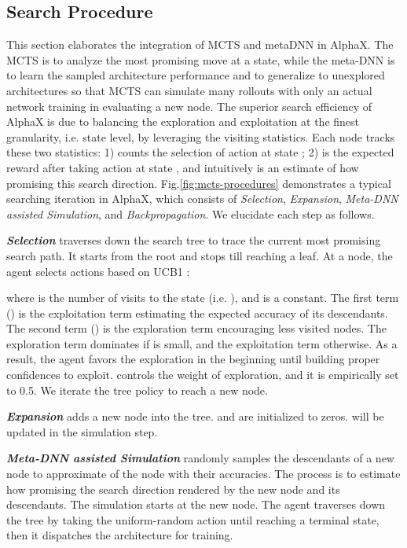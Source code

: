 \documentclass[10pt,twocolumn,letterpaper]{article}
\begin{document}
\subsection{Search Procedure}

\label{sec:search}

This section elaborates the integration of MCTS and metaDNN in AlphaX. The MCTS is to analyze the most promising move at a state, while the meta-DNN is to learn the sampled architecture performance and to generalize to unexplored architectures so that MCTS can simulate many rollouts with only an actual network training in evaluating a new node. The superior search efficiency of AlphaX is due to balancing the exploration and exploitation at the finest granularity, i.e. state level, by leveraging the visiting statistics. Each node tracks these two statistics: 1)  counts the selection of action  at state ; 2)  is the expected reward after taking action  at state , and intuitively  is an estimate of how promising this search direction. Fig.\ref{fig:mcts-procedures} demonstrates a typical searching iteration in AlphaX, which consists of \textit{Selection}, \textit{Expansion}, \textit{Meta-DNN assisted Simulation}, and \textit{Backpropagation}. We elucidate each step as follows.



\textbf{\textit{Selection}} traverses down the search tree to trace the current most promising search path. It starts from the root and stops till reaching a leaf. At a node, the agent selects actions based on UCB1 \cite{auer2002finite}:

where  is the number of visits to the state  (i.e. ), and  is a constant. The first term () is the exploitation term estimating the expected accuracy of its descendants. The second term () is the exploration term encouraging less visited nodes. The exploration term dominates  if  is small, and the exploitation term otherwise. As a result, the agent favors the exploration in the beginning until building proper confidences to exploit.  controls the weight of exploration, and it is empirically set to 0.5. We iterate the tree policy to reach a new node.



\textbf{\textit{Expansion}} adds a new node into the tree.  and  are initialized to zeros.  will be updated in the simulation step.


\textbf{\textit{Meta-DNN assisted Simulation}} randomly samples the descendants of a new node to approximate  of the node with their accuracies.
The process is to estimate how promising the search direction rendered by the new node and its descendants. The simulation starts at the new node. The agent traverses down the tree by taking the uniform-random action until reaching a terminal state, then it dispatches the architecture for training.
\end{document}
